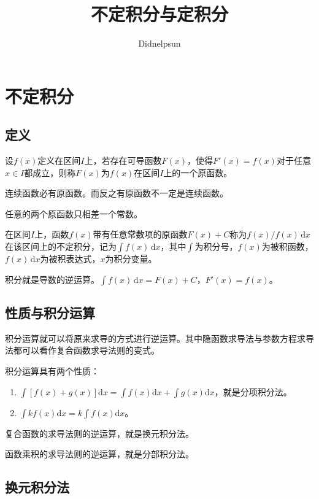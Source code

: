 \documentclass[UTF8, 12pt]{ctexart}
\author{Didnelpsun}
\title{不定积分与定积分}
\date{}
\begin{document}
\maketitle
\pagestyle{empty}
\thispagestyle{empty}
\tableofcontents
\thispagestyle{empty}
\newpage
\pagestyle{plain}
\setcounter{page}{1}
\section{不定积分}

\subsection{定义}

设$f(x)$定义在区间$I$上，若存在可导函数$F(x)$，使得$F'(x)=f(x)$对于任意$x\in I$都成立，则称$F(x)$为$f(x)$在区间$I$上的一个原函数。

连续函数必有原函数。而反之有原函数不一定是连续函数。

任意的两个原函数只相差一个常数。

在区间$I$上，函数$f(x)$带有任意常数项的原函数$F(x)+C$称为$f(x)/f(x)\,\textrm{d}x$在该区间上的不定积分，记为$\int f(x)\,\textrm{d}x$，其中$\int$为积分号，$f(x)$为被积函数，$f(x)\,\textrm{d}x$为被积表达式，$x$为积分变量。

积分就是导数的逆运算。$\int f(x)\,\textrm{d}x=F(x)+C$，$F'(x)=f(x)$。 

\subsection{性质与积分运算}

积分运算就可以将原来求导的方式进行逆运算。其中隐函数求导法与参数方程求导法都可以看作复合函数求导法则的变式。

积分运算具有两个性质：

\begin{enumerate}
    \item $\int[f(x)+g(x)]\textrm{d}x=\int f(x)\textrm{d}x+\int g(x)\textrm{d}x$，就是分项积分法。
    \item $\int kf(x)\textrm{d}x=k\int f(x)\textrm{d}x$。
\end{enumerate}

复合函数的求导法则的逆运算，就是换元积分法。

函数乘积的求导法则的逆运算，就是分部积分法。

\subsection{换元积分法}
\end{document}
